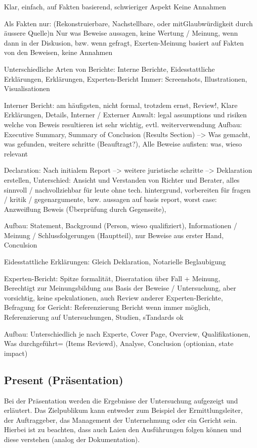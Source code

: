 Klar, einfach, auf Fakten basierend, schwieriger Aspekt
Keine Annahmen

Als Fakten nur: (Rekonstruierbare, Nachstellbare, oder mitGlaubwürdigkeit durch äussere Quelle)n
Nur was Beweise aussagen, keine Wertung / Meinung, wenn dann in der Diskusion, bzw. wenn gefragt, 
Exerten-Meinung basiert auf Fakten von den Beweisen, keine Annahmen

Unterschiedliche Arten von Berichte: Interne Berichte, Eidesstattliche Erklärungen, Erklärungen, Experten-Bericht
Immer: Screenshots, Illustrationen, Visualisationen


Interner Bericht: am häufigsten, nicht formal, trotzdem ernst, Review!, Klare Erklärungen, Details, 
Interner / Externer Anwalt: legal assumptions und risiken welche von Beweis resultieren ist sehr wichtig, evtl. weiterverwendung 
Aufbau: Executive Summary, Summary of Conclusion (Results Section) --> Was gemacht, was gefunden, weitere schritte (Beauftragt?), Alle Beweise aufisten: was, wieso relevant


Declaration: Nach initialem Report --> weitere juristische schritte --> Deklaration erstellen, Unterschied: Ansicht und Verstanden von Richter und Berater, alles sinnvoll / nachvollziehbar für leute ohne tech. hintergrund, vorbereiten für fragen / kritik / gegenargumente, bzw. aussagen auf basis report, worst case: Anzweiflung Beweis (Überprüfung durch Gegenseite), 

Aufbau: Statement, Background (Person, wieso qualifiziert), Informationen / Meinung / Schlussfolgerungen (Hauptteil), nur Beweise aus erster Hand, Conculsion

Eidesstattliche Erklärungen: Gleich Deklaration, Notarielle Beglaubigung

Experten-Bericht: Spitze formalität, Diseratation über Fall + Meinung, Berechtigt zur Meinungsbildung aus Basis der Beweise / Untersuchung, aber vorsichtig, keine spekulationen, auch Review anderer Experten-Berichte, Befragung for Gericht: Referenzierung Bericht wenn immer möglich, Referenzierung auf Untersuchungen, Studien, sTandards ok

Aufbau: Unterschiedlich je nach Experte, Cover Page, Overview, Qualifikationen, Was durchgeführt= (Items Reviewd), Analyse, Conclusion (optionian, state impact)

\subsection{Present (Präsentation)}
Bei der Präsentation werden die Ergebnisse der Untersuchung aufgezeigt und erläutert. Das Zielpublikum kann entweder zum Beispiel der Ermittlungsleiter, der Auftraggeber, das Management der Unternehmung oder ein Gericht sein. Hierbei ist zu beachten, dass auch Laien den Ausführungen folgen können und diese verstehen (analog der Dokumentation).

